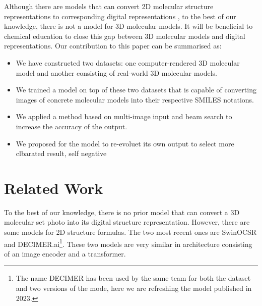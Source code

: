 \documentclass{article}
\begin{document}
Although there are models that can convert 2D molecular structure representations to corresponding digital representations \autocite{swinocsr}\autocite{decimer}\autocite{chempix}, to the best of our knowledge, there is not a model for 3D molecular models. It will be beneficial to chemical education to close this gap between 3D molecular models and digital representations. 
Our contribution to this paper can be summarised as:
\begin{itemize}
\item We have constructed two datasets: one computer-rendered 3D molecular model and another consisting of real-world 3D molecular models.
\item We trained a model on top of these two datasets that is capable of converting images of concrete molecular models into their respective SMILES notations. 
\item We applied a method based on multi-image input and beam search to increase the accuracy of the output.
\item We proposed for the model to re-evoluet its own output to select more clbarated result, self negative
\end{itemize}

\section{Related Work}
To the best of our knowledge, there is no prior model that can convert a 3D molecular set photo into its digital structure representation. However, there are some models for 2D structure formulas. The two most recent ones are SwinOCSR\autocite{swinocsr} and DECIMER.ai\footnote{The name DECIMER has been used by the same team for both the dataset and two versions of the mode, here we are refreshing the model published in 2023.}\autocite{decimer}. These two models are very similar in architecture consisting of an image encoder and a transformer.

\end{document}
